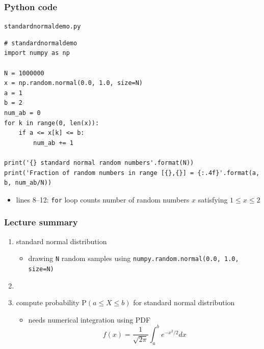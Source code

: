 \documentclass[english,14pt]{beamer}
\begin{document}

\begin{frame}[fragile]

\frametitle{Python code}

\texttt{standardnormaldemo.py}
\begin{lstlisting}[style=CStyle,basicstyle=\scriptsize]
# standardnormaldemo
import numpy as np

N = 1000000
x = np.random.normal(0.0, 1.0, size=N)
a = 1
b = 2
num_ab = 0
for k in range(0, len(x)):
    if a <= x[k] <= b:
        num_ab += 1

print('{} standard normal random numbers'.format(N))
print('Fraction of random numbers in range [{},{}] = {:.4f}'.format(a, b, num_ab/N))
\end{lstlisting}

\begin{itemize}
	\item lines 8--12: \texttt{for} loop counts number of random numbers $x$ satisfying $1 \leq x \leq 2$
\end{itemize}

\end{frame}


\begin{frame}[fragile]

\frametitle{Lecture summary}

\begin{enumerate}
	\item standard normal distribution
	\begin{itemize}
		\item drawing \texttt{N} random samples using \texttt{numpy.random.normal(0.0, 1.0, size=N)}
	\end{itemize}
	
	\item[]
	
	\item compute probability $\mathrm{P}(a \leq X \leq b)$ for standard normal distribution
	\begin{itemize}
		\item needs numerical integration using PDF
		\[
			f(x) = \frac{1}{\sqrt{2\pi}} \int_a^b e^{-x^2/2} dx
		\]
	\end{itemize}
	
\end{enumerate}

\end{frame}
\end{document}
